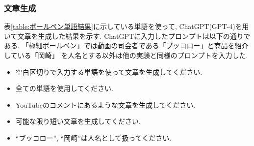 \documentclass{ltjarticle}
\begin{document}
\subsubsection{文章生成}
表\ref{table:ボールペン単語結果}に示している単語を使って, ChatGPT(GPT-4)を用いて文章を生成した結果を示す. 
ChatGPTに入力したプロンプトは以下の通りである.  「極細ボールペン」では動画の司会者である「ブッコロー」と商品を紹介している「岡崎」
を人名とする以外は他の実験と同様のプロンプトを入力した. 
\begin{itemize}
    \item 空白区切りで入力する単語を使って文章を生成してください.
    \item 全ての単語を使用してください.
    \item YouTubeのコメントにあるような文章を生成してください.
    \item 可能な限り短い文章を生成してください.
    \item ``ブッコロー'', ``岡崎''は人名として扱ってください.
\end{itemize}
\vspace{10truept}
\end{document}
